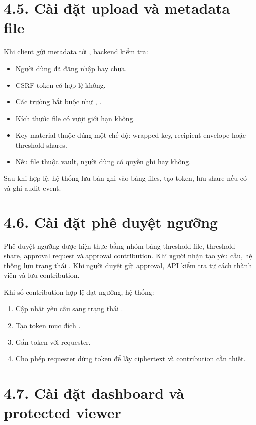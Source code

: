 \section*{4.5. Cài đặt upload và metadata file}
{}

Khi client gửi metadata tới , backend kiểm tra:

\begin{itemize}
  \item Người dùng đã đăng nhập hay chưa.
  \item CSRF token có hợp lệ không.
  \item Các trường bắt buộc như , .
  \item Kích thước file có vượt giới hạn không.
  \item Key material thuộc đúng một chế độ: wrapped key, recipient envelope hoặc threshold shares.
  \item Nếu file thuộc vault, người dùng có quyền ghi hay không.
\end{itemize}

Sau khi hợp lệ, hệ thống lưu bản ghi vào bảng files, tạo token, lưu share nếu có và ghi audit event.

\section*{4.6. Cài đặt phê duyệt ngưỡng}
{}

Phê duyệt ngưỡng được hiện thực bằng nhóm bảng threshold file, threshold share, approval request và approval contribution. Khi người nhận tạo yêu cầu, hệ thống lưu trạng thái . Khi người duyệt gửi approval, API kiểm tra tư cách thành viên và lưu contribution.

Khi số contribution hợp lệ đạt ngưỡng, hệ thống:

\begin{enumerate}
  \item Cập nhật yêu cầu sang trạng thái .
  \item Tạo token mục đích .
  \item Gắn token với requester.
  \item Cho phép requester dùng token để lấy ciphertext và contribution cần thiết.
\end{enumerate}

\section*{4.7. Cài đặt dashboard và protected viewer}
{}

